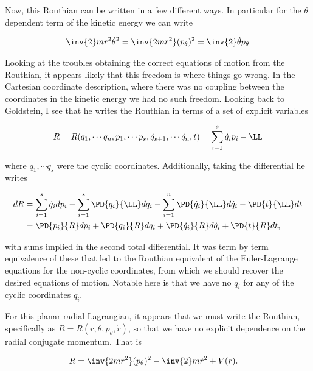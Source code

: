 Now, this Routhian can be written in a few different ways.  In particular for the $\dot{\theta}$ dependent term of the kinetic energy we can write

\begin{align}\label{eqn:goldsteinRouth:35}
\inv{2} m r^2 \dot{\theta}^2 = \inv{2 m r^2 } (p_\theta)^2 = \inv{2 } \dot{\theta} p_\theta
\end{align}

Looking at the troubles obtaining the correct equations of motion from the Routhian, it appears likely that this freedom is where things go wrong.  In the Cartesian coordinate description, where there was no coupling between the coordinates in the kinetic energy we had no such freedom.  Looking back to Goldstein, I see that he writes the Routhian in terms of a set of explicit variables

\begin{align}\label{eqn:goldsteinRouth:36}
R = R(q_1, \cdots q_n, p_1, \cdots p_s, \dot{q}_{s+1}, \cdots \dot{q}_n, t) = \sum_{i=1}^{s} \dot{q}_i p_i - \LL
\end{align}

where $q_1, \cdots q_s$ were the cyclic coordinates.  Additionally, taking the differential he writes

\begin{align}\label{eqn:goldsteinRouth:37}
dR &= 
  \sum_{i=1}^{s} \dot{q}_i dp_i 
- \sum_{i=1}^s \PD{q_i}{\LL} dq_i
- \sum_{i=1}^n \PD{\dot{q}_i}{\LL} d\dot{q}_i
- \PD{t}{\LL} dt \\
&=
\PD{p_i}{R} dp_i 
+ \PD{q_i}{R} dq_i 
+ \PD{\dot{q}_i}{R} d\dot{q}_i
+ \PD{t}{R} dt,
\end{align}

with sums implied in the second total differential.  It was term by term equivalence of these that led to the Routhian equivalent of the Euler-Lagrange equations for the non-cyclic coordinates, from which we should recover the desired equations of motion.  Notable here is that we have no $\dot{q}_i$ for any of the cyclic coordinates $q_i$.

For this planar radial Lagrangian, it appears that we must write the Routhian, specifically as $R = R(r, \theta, p_\theta, \dot{r})$, so that we have no explicit dependence on the radial conjugate momentum.  That is

\begin{align}\label{eqn:goldsteinRouth:38}
R &= 
\inv{2 m r^2} (p_\theta)^2 - \inv{2} m \dot{r}^2 + V(r).
\end{align}

